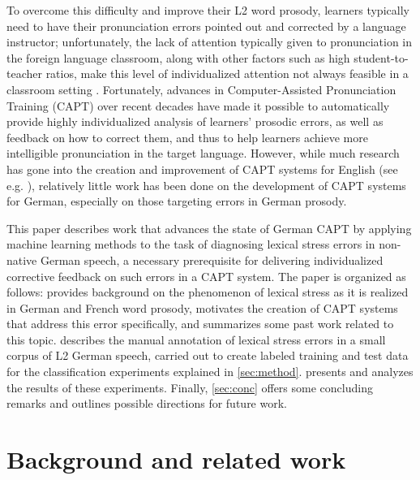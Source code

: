 \documentclass[a4paper]{article}
\begin{document}
  To overcome this difficulty and improve their L2 word prosody, learners typically need to have their pronunciation errors pointed out and corrected by a language instructor; unfortunately, the lack of attention typically given to pronunciation in the foreign language classroom, 
  along with other factors such as high student-to-teacher ratios,
  make this level of individualized attention not always feasible in a classroom setting \cite{Neri2002,Derwing2005,Hirschfeld2007}. Fortunately, advances in Computer-Assisted Pronunciation Training (CAPT) over recent decades have made it possible to automatically provide highly individualized analysis of learners' prosodic errors, as well as feedback on how to correct them, and thus to help learners achieve more intelligible pronunciation in the target language. However, while much research has gone into the creation and improvement of CAPT systems for English (see e.g. \cite{Eskenazi2009,Witt2012}), relatively little work has been done on the development of CAPT systems for German, especially on those targeting errors in German prosody.
  
  This paper describes work that advances the state of German CAPT by applying machine learning methods to the task of diagnosing lexical stress errors in non-native German speech, a necessary prerequisite for delivering individualized corrective feedback on such errors in a CAPT system. The paper is organized as follows:  provides background on the phenomenon of lexical stress as it is realized in German and French word prosody, motivates the creation of CAPT systems that address this error specifically, and summarizes some past work related to this topic.  describes the manual annotation of lexical stress errors in a small corpus of L2 German speech, carried out to create labeled training and test data for the classification experiments explained in \cref{sec:method}.  presents and analyzes the results of these experiments. Finally, \cref{sec:conc} offers some concluding remarks and outlines possible directions for future work.



	\section{Background and related work}
	\label{sec:bkgd}
	
\end{document}
